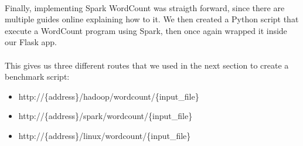 \paragraph{}Finally, implementing Spark WordCount was straigth forward, since there are multiple guides online explaining how to it. We then created a Python script that execute a WordCount program using Spark, then once again wrapped it inside our Flask app.

\paragraph{}This gives us three different routes that we used in the next section to create a benchmark script:

\begin{itemize}
  \item http://\{address\}/hadoop/wordcount/\{input\_file\}
  \item http://\{address\}/spark/wordcount/\{input\_file\}
  \item http://\{address\}/linux/wordcount/\{input\_file\}
\end{itemize}
\pagebreak












